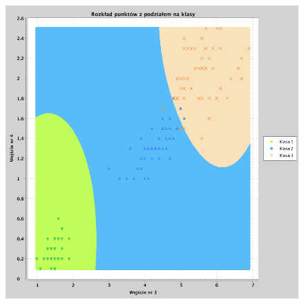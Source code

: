 \documentclass[a4paper, portrait,11pt]{article}
\begin{document}
\begin{figure}[!htb]
\begin{minipage}{0.33\textwidth}
    \caption{\label{fig:43_2_2,4derivative}}
  \end{minipage}
  \begin{minipage}{0.33\textwidth}
    \centering
    \includegraphics[width=1\linewidth]{../data/classification4/3/derivatives/2_3,4.png}
    \caption{\label{fig:43_2_3,4derivative}}
  \end{minipage}\hfill
\end{figure}
\end{document}
